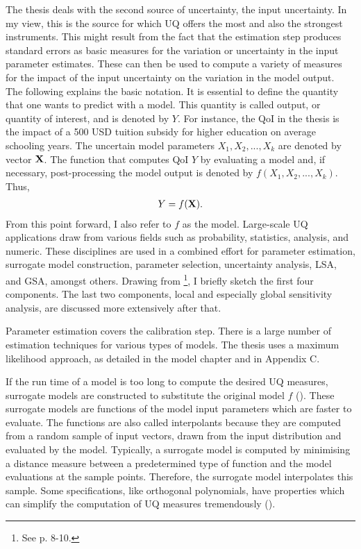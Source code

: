 The thesis deals with the second source of uncertainty, the input uncertainty. In my view, this is the source for which UQ offers the most and also the strongest instruments. This might result from the fact that the estimation step produces standard errors as basic measures for the variation or uncertainty in the input parameter estimates. These can then be used to compute a variety of measures for the impact of the input uncertainty on the variation in the model output.\\
\newline
The following explains the basic notation. It is essential to define the quantity that one wants to predict with a model. This quantity is called output, or quantity of interest, and is denoted by $Y$. For instance, the QoI in the thesis is the impact of a 500 USD tuition subsidy for higher education on average schooling years. The uncertain model parameters $X_1, X_2, ..., X_k$ are denoted by vector $\bold{X}$. The function that computes QoI $Y$ by evaluating a  model and, if necessary, post-processing the model output is denoted by $f(X_1, X_2, ..., X_k)$. Thus,
\begin{align}
Y = f(\bold{X}).
\end{align}
From this point forward, I also refer to $f$ as the model. Large-scale UQ applications draw from various fields such as probability, statistics, analysis, and numeric. These disciplines are used in a combined effort for parameter estimation, surrogate model construction, parameter selection, uncertainty analysis, LSA, and GSA, amongst others. Drawing from \cite{Smith.2014}\footnote{See p. 8-10.}, I briefly sketch the first four components. The last two components, local and especially global sensitivity analysis, are discussed more extensively after that.

Parameter estimation covers the calibration step. There is a large number of estimation techniques for various types of models. The thesis uses a maximum likelihood approach, as detailed in the model chapter and in Appendix C.

If the run time of a model is too long to compute the desired UQ measures, surrogate models are constructed to substitute the original model $f$ (\cite{mcbride2019overview}). These surrogate models are functions of the model input parameters which are faster to evaluate. The functions are also called interpolants because they are computed from a random sample of input vectors, drawn from the input distribution and evaluated by the model. Typically, a surrogate model is computed by minimising a distance measure between a predetermined type of function and the model evaluations at the sample points. Therefore, the surrogate model interpolates this sample. Some specifications, like orthogonal polynomials, have properties which can simplify the computation of UQ measures tremendously (\cite{xiu2010numerical}).

